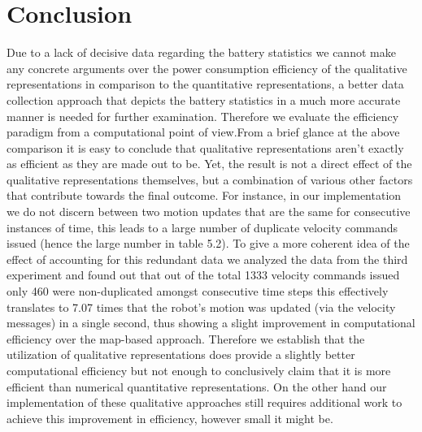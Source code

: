 \section{Conclusion}
Due to a lack of decisive data regarding the battery statistics we cannot make any concrete arguments over the power consumption efficiency of the qualitative representations in comparison to the quantitative representations, a better data collection approach that depicts the battery statistics in a much more accurate manner is needed for further examination. Therefore we evaluate the efficiency paradigm from a computational point of view.From a brief glance at the above comparison it is easy to conclude that qualitative representations aren't exactly as efficient as they are made out to be. Yet, the result is not a direct effect of the qualitative representations themselves, but a combination of various other factors that contribute towards the final outcome. For instance, in our implementation we do not discern between two motion updates that are the same for consecutive instances of time, this leads to a large number of duplicate velocity commands issued (hence the large number in table 5.2). To give a more coherent idea of the effect of accounting for this redundant data we analyzed the data from the third experiment and found out that out of the total 1333 velocity commands issued only 460 were non-duplicated amongst consecutive time steps this effectively translates to 7.07 times that the robot's motion was updated (via the velocity messages) in a single second, thus showing a slight improvement in computational efficiency over the map-based approach. Therefore we establish that the utilization of qualitative representations does provide a slightly better computational efficiency but not enough to conclusively claim that it is more efficient than numerical quantitative representations. On the other hand our implementation of these qualitative approaches still requires additional work to achieve this improvement in efficiency, however small it might be. 

